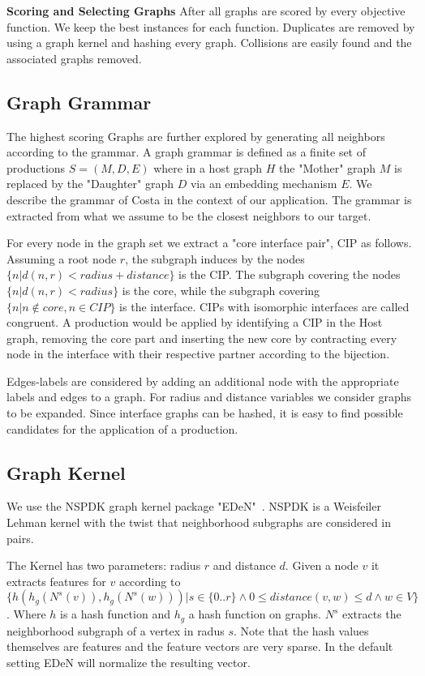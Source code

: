\documentclass{esannV2}
\begin{document}
\textbf{Scoring and Selecting Graphs}
After all graphs are scored by every objective function. We keep the best instances for 
each function.  
Duplicates are removed by using a graph kernel and hashing every graph. 
Collisions are easily found and the associated graphs removed.

\subsection{Graph Grammar}
The highest scoring Graphs are further explored by generating all neighbors according to 
the grammar. A graph grammar is defined as a finite set of productions $S=(M,D,E)$ where in 
a host graph $H$ the "Mother" graph $M$ is replaced by the "Daughter" graph $D$ via an 
embedding mechanism $E$. We describe the grammar of Costa \cite{costa16gl} in the context of our application.
The grammar is extracted from what we assume to be the closest neighbors to our target.

For every node in the graph set we extract a "core interface pair", CIP as follows.
Assuming a root node $r$, 
the subgraph induces by the nodes $\{ n | d(n,r) < radius+distance \}$ is the CIP.
The subgraph covering the nodes $\{ n | d(n,r) < radius \}$ is the core, while the subgraph covering
$\{ n | n \notin core , n \in CIP \}$ is the interface.
CIPs with isomorphic interfaces are called congruent.
A production would be applied by identifying a CIP in the Host graph, 
removing the core part and inserting the 
new core by contracting every node in the interface 
with their respective partner according to the bijection.

Edges-labels are considered by adding an additional node with the appropriate labels and edges to
a graph. For radius and distance variables we consider graphs to be expanded.
Since interface graphs can be hashed, it is easy to find possible
candidates for the application of a production. 


\subsection{Graph Kernel}
We use the NSPDK graph kernel package "EDeN"~\cite{costa2010fast}. NSPDK is a Weisfeiler Lehman \cite{weisfeiler}
kernel with the twist that neighborhood subgraphs are considered in pairs.

The Kernel has two parameters: radius $r$ and distance $d$. Given a node $v$ it extracts features for $v$ according to 
$\{ h(h_g(N^s(v)),h_g(N^s(w))) | s \in \{0..r\} \wedge 0 \leq
distance(v,w) \leq d  \wedge w\in V \}$.  Where $h$ is a hash function and 
$h_g$ a hash function on graphs. $N^s$ extracts the neighborhood subgraph of a
vertex in radus $s$. Note that the hash values themselves are features and the feature
vectors are very sparse. In the default setting EDeN will normalize the resulting vector.
\end{document}

